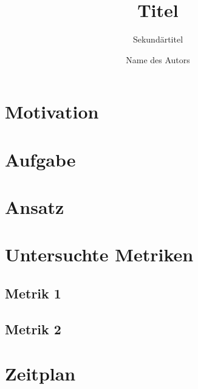 \documentclass[fontsize=11pt,%
               paper=a4,%
               DIV=17]{scrartcl}
\title{Titel}
\subtitle{Sekundärtitel}
\author{Name des Autors}
\begin{document}
\maketitle

\section*{Motivation}
\blindtext

\section*{Aufgabe}
\blindtext

\section*{Ansatz}
\blindtext

\section*{Untersuchte Metriken}
\blindtext

\subsection*{Metrik 1}
\blindtext

\subsection*{Metrik 2}
\blindtext

\section*{Zeitplan}
\blindtext


\end{document}
